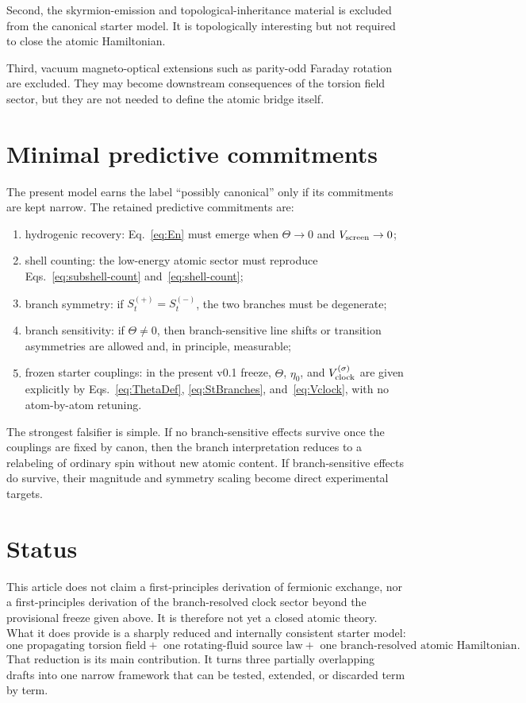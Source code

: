 \documentclass[11pt,a4paper]{article}
\begin{document}
Second, the skyrmion-emission and topological-inheritance material is excluded from the canonical starter model. It is topologically interesting but not required to close the atomic Hamiltonian.

Third, vacuum magneto-optical extensions such as parity-odd Faraday rotation are excluded. They may become downstream consequences of the torsion field sector, but they are not needed to define the atomic bridge itself.

\section{Minimal predictive commitments}
The present model earns the label ``possibly canonical'' only if its commitments are kept narrow. The retained predictive commitments are:
\begin{enumerate}[label=(P\arabic*)]
    \item hydrogenic recovery: Eq.~\eqref{eq:En} must emerge when $\Theta\to 0$ and $V_{\rm screen}\to 0$;
    \item shell counting: the low-energy atomic sector must reproduce Eqs.~\eqref{eq:subshell-count} and~\eqref{eq:shell-count};
    \item branch symmetry: if $S_t^{(+)}=S_t^{(-)}$, the two branches must be degenerate;
    \item branch sensitivity: if $\Theta\neq 0$, then branch-sensitive line shifts or transition asymmetries are allowed and, in principle, measurable;
    \item frozen starter couplings: in the present v0.1 freeze, $\Theta$, $\eta_0$, and $V_{\rm clock}^{(\sigma)}$ are given explicitly by Eqs.~\eqref{eq:ThetaDef}, \eqref{eq:StBranches}, and~\eqref{eq:Vclock}, with no atom-by-atom retuning.
\end{enumerate}

The strongest falsifier is simple. If no branch-sensitive effects survive once the couplings are fixed by canon, then the branch interpretation reduces to a relabeling of ordinary spin without new atomic content. If branch-sensitive effects do survive, their magnitude and symmetry scaling become direct experimental targets.

\section{Status}
This article does not claim a first-principles derivation of fermionic exchange, nor a first-principles derivation of the branch-resolved clock sector beyond the provisional freeze given above. It is therefore not yet a closed atomic theory. What it does provide is a sharply reduced and internally consistent starter model:
\begin{equation}
\boxed{
\text{one propagating torsion field}
+\text{ one rotating-fluid source law}
+\text{ one branch-resolved atomic Hamiltonian}.
}
\end{equation}
That reduction is its main contribution. It turns three partially overlapping drafts into one narrow framework that can be tested, extended, or discarded term by term.
\end{document}
